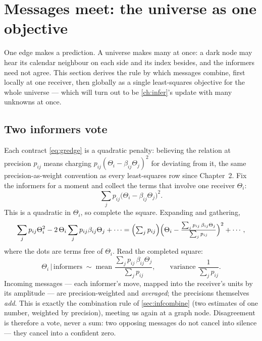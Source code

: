 \section{Messages meet: the universe as one objective}
\label{sec:grmeet}

One edge makes a prediction.  A universe makes many at once: a dark
node may hear its calendar neighbour on each side and its index
besides, and the informers need not agree.  This section derives the
rule by which messages combine, first locally at one receiver, then
globally as a single least-squares objective for the whole universe
--- which will turn out to be \cref{ch:infer}'s update with many
unknowns at once.

\subsection{Two informers vote}

Each contract \cref{eq:gredge} is a quadratic penalty: believing the
relation at precision $p_{ij}$ means charging
$p_{ij}(\Theta_i-\beta_{ij}\Theta_j)^{2}$ for deviating from it, the
same precision-as-weight convention as every least-squares row since
Chapter~2.  Fix the informers for a moment and collect the terms that
involve one receiver $\Theta_i$:
\[
\sum_j p_{ij}\bigl(\Theta_i-\beta_{ij}\Theta_j\bigr)^{2}.
\]
This is a quadratic in $\Theta_i$, so complete the square.  Expanding
and gathering,
\[
\sum_j p_{ij}\Theta_i^{2}
-2\,\Theta_i\sum_j p_{ij}\beta_{ij}\Theta_j+\cdots
=\Bigl(\textstyle\sum_j p_{ij}\Bigr)
\Bigl(\Theta_i-\frac{\sum_j p_{ij}\,\beta_{ij}\Theta_j}
{\sum_j p_{ij}}\Bigr)^{2}+\cdots,
\]
where the dots are terms free of $\Theta_i$.  Read the completed
square:
\begin{equation}
\Theta_i \,\big|\, \text{informers}
\;\sim\;
\text{mean } \frac{\sum_j p_{ij}\,\beta_{ij}\Theta_j}{\sum_j p_{ij}},
\qquad
\text{variance } \frac{1}{\sum_j p_{ij}}.
\label{eq:grcond}
\end{equation}
Incoming messages --- each informer's move, mapped into the receiver's
units by its amplitude --- are precision-weighted and \emph{averaged};
the precisions themselves \emph{add}.  This is exactly the combination
rule of \cref{sec:infcombine} (two estimates of one number, weighted
by precision), meeting us again at a graph node.  Disagreement is
therefore a vote, never a sum: two opposing messages do not cancel
into silence --- they cancel into a confident zero.

